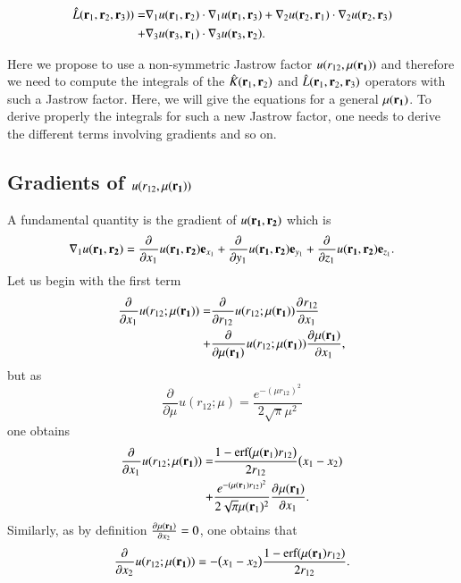 \documentclass[aip,jcp,reprint,noshowkeys,superscriptaddress]{revtex4-1}
\newcommand{\deriv}[3]{\frac{\partial^{#3} #1}{\partial {#2}^{#3}}}
\newcommand{\bd}[1]{{\bf {#1}}}
\newcommand{\bri}[1]{{\bf r}_{#1}}
\newcommand{\mur}[1]{\mu({\bf r_{#1}})}
\begin{document}
\begin{equation}
 \begin{aligned}
 \label{def_k}
  \hat{L}(\bri{1},\bri{2},\bri{3}) ) = & \nabla_1 u(\bri{1},\bri{2}) \cdot \nabla_1 u(\bri{1},\bri{3}) + \nabla_2 u(\bri{2},\bri{1}) \cdot \nabla_2 u(\bri{2},\bri{3})  \\
                                     + & \nabla_3 u(\bri{3},\bri{1}) \cdot \nabla_3 u(\bri{3},\bri{2}).
 \end{aligned}
\end{equation}

Here we propose to use a non-symmetric Jastrow factor $ u(r_{12},\mur{1})$ and therefore we need to compute the integrals of the $\hat{K}(\bri{1},\bri{2})$ and $\hat{L}(\bri{1},\bri{2},\bri{3})$ operators with such a Jastrow factor. 
Here, we will give the equations for a general $\mur{1}$. 
To derive properly the integrals for such a new Jastrow factor, one needs to derive the different terms involving gradients and so on. 


\subsection{Gradients of ${u}(r_{12},\mur{1})$}
A fundamental quantity is the gradient of ${u}(\bd{r_1},\bd{r_2})$ which is 
\begin{equation}
 \nabla_1 {u}(\bd{r_1},\bd{r_2}) = \deriv{}{x_1}{} {u}(\bd{r_1},\bd{r_2}) {\bf e}_{x_1} + \deriv{}{y_1}{} {u}(\bd{r_1},\bd{r_2}) {\bf e}_{y_1} + \deriv{}{z_1}{} {u}(\bd{r_1},\bd{r_2}) {\bf e}_{z_1}.
\end{equation}
Let us begin with the first term 
\begin{equation}
 \begin{aligned}
 \deriv{}{x_1}{} u(r_{12};\mur{1})=& \deriv{}{r_{12}}{} u(r_{12};\mur{1})\deriv{r_{12}}{x_1}{} \\ 
                                  +& \deriv{}{\mur{1}}{}u(r_{12};\mur{1}) \deriv{\mur{1}}{x_1}{},
 \end{aligned}
\end{equation}
but as 
\begin{equation}
 \deriv{}{\mu}{}u(r_{12};\mu) = \frac{e^{-(\mu r_{12})^2}}{2 \sqrt{\pi} \mu^2}
\end{equation}
one obtains 
\begin{equation}
 \begin{aligned}
  \label{eq:grad_mur_1}
 \deriv{}{x_1}{} u(r_{12};\mur{1}) =& \frac{1 - \text{erf}\big(\mu(\bri{1}) r_{12} \big)}{2 r_{12}}\big( x_1 - x_2) \\
                                   +&\frac{e^{-(\mu(\bri{1}) r_{12})^2}}{2 \sqrt{\pi} \mu(\bri{1})^2} \deriv{\mur{1}}{x_1}{}.  
 \end{aligned}
\end{equation}
Similarly, as by definition $\deriv{\mur{1}}{x_2}{} = 0$, one obtains that 
\begin{equation}
 \label{eq_grad_mur_r2}
 \deriv{}{x_2}{} u(r_{12};\mur{1}) = -\big(x_1 - x_2 \big)\frac{1 - \text{erf}(\mur{1} r_{12})}{2 r_{12}} .
\end{equation}
\end{document}
